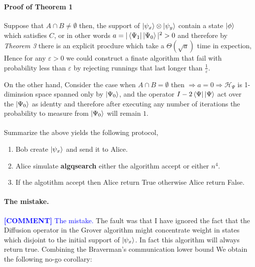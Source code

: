 \documentclass{article}
\newcommand{\commentt}[1]{\textcolor{blue}{ \textbf{[COMMENT]} #1}}
\newcommand{\ctt}[1]{\commentt{#1}}
\begin{document}
\begin{multicols*}{2}
\paragraph{} 

\paragraph{Proof of Theorem 1} 
Suppose that \( A \cap B \neq \emptyset \) then, the support of \( \ket{\psi_x} \otimes \ket{\psi_y} \) contain a state \( \ket{\phi} \) which satisfies \(C\), or in other words $a = |\bra{\Psi_1}\ket{\Psi_0}|^2 > 0 $ and therefore by \textit{Theorem 3} there is an explicit procdure which take a $\Theta(\sqrt{a})$ time in expection, Hence for any \(\varepsilon >0\) we could construct a finate algorithm that fail with probability less than $ \varepsilon $ by rejecting runnings that last longer than $\frac{1}{\varepsilon}$. 
  
On the other hand, Consider the case when \(A \cap B = \emptyset\) then $\Rightarrow a = 0 \Rightarrow \mathcal{H}_{\Psi}$ is 1-diminsion space spanned only by $\ket{\Psi_0} $, and the operator $ I - 2 \bra{\Psi}\ket{\Psi} $ act over the $ \ket{\Psi_0}  $ as identty and therefore after executing any number of iterations the probability to measure from $\ket{\Psi_0}$ will remain $1$.

\paragraph{}Summarize the above yields the following protocol,
\begin{enumerate}
    \item Bob create \( \ket{\psi_x} \) and send it to Alice.
    \item Alice simulate \textbf{algqsearch} either the algorithm accept or either $n^4$.     
    \item If the algotithm accept then Alice return True otherwise Alice return False. 
\end{enumerate}



\paragraph{ The mistake.} \ctt{The mistake.} The fault was that I have ignored the fact that the Diffusion operator in the Grover algorithm might concentrate weight in states which disjoint to the initial support of \( \ket{\psi_{x}}\). In fact this algorithm will always return true. 
Combining the Braverman's communication  lower bound We obtain the following no-go corollary:  
\printbibliography 
\end{multicols*}
\end{document}
